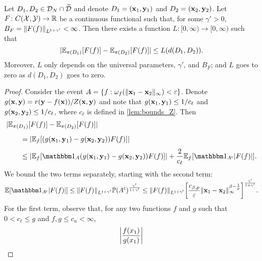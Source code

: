 \documentclass[12pt, twoside]{report}
\begin{document}
\begin{proposition} \label{prop:Lipschitzness_functional}
    Let $D_1, D_2 \in \D_N \cap \tD$ and denote $D_1 = (\vx_1, \vy_1)$ and $D_2 = (\vx_2, \vy_2)$.
    Let $F\colon C(\X, \Y) \to \R$ be a continuous functional such that, for some $\gamma' > 0$, $B_F = \norm{F(f)}_{L^{1+\gamma'}} < \infty$.
    Then there exists a function $L\colon[0,\infty) \to [0, \infty)$ such that
    \begin{equation}
        \abs{\E_{\pi(D_1)}[F(f)] - \E_{\pi(D_2)}[F(f)]}
        \le L(d(D_1, D_2)).
    \end{equation}
    Moreover, $L$ only depends on the universal parameters, $\gamma'$, and $B_F$; and $L$ goes to zero as $d(D_1, D_2)$ goes to zero.
\end{proposition}
\begin{proof}
    Consider the event $A = \set{f : 
        \omega_f(\norm{\vx_1 - \vx_2}_\infty) < \e
    }$.
    Denote $g(\vx, \vy) = r(\vy - f(\vx)) / Z(\vx, \vy)$ and
    note that $g(\vx_1, \vy_1) \le 1 /c_\ell$ and $g(\vx_2, \vy_2) \le 1/c_\ell$, where $c_\ell$ is defined in \cref{lem:bounds_Z}.
    Then
    \begin{align}
        &\abs{\E_{\pi(D_1)}[F(f)] - \E_{\pi(D_2)}[F(f)]} \nonumber \\
        &\qquad = \vphantom{\frac11} \abs{\E_f\sbrac{
            \parens{
                g(\vx_1, \vy_1)
                - g(\vx_2, \vy_2)
            }
            F(f)
        }} \\
        &\qquad \le \abs{\E_f\sbrac{
            \ind_A\parens{
                g(\vx_1, \vy_1)
                - g(\vx_2, \vy_2)
            }
            F(f)
        }} + \frac2{c_\ell} \E_f[\ind_{A^\c}\abs{F(f)}].
    \end{align}
    We bound the two terms separately, starting with the second term:
    \begin{equation}
        \E[\ind_{A^\c} \abs{F(f)}]
        \le
            \norm{F(f)}_{L^{1 + \gamma'}}
            \P(A^\c)^{\frac{\gamma'}{1 + \gamma'}} 
        \le
            \norm{F(f)}_{L^{1 + \gamma'}}
            \sbrac*{
                \frac{c_{\beta, p}}{\e} \norm{\vx_1 - \vx_2}_\infty^{\beta - \frac{1}{p}}
            }^{\smash{\frac{\gamma'}{1 + \gamma'}}}.
    \end{equation}
    For the first term, observe that, for any two functions $f$ and $g$ such that $0 < c_\ell \le g$ and $f, g \le c_u < \infty$,
    \begin{equation}
        \abs*{
            \frac{f(x_1)}{g(x_1)}
}
\end{equation}
\end{proof}
\end{document}
